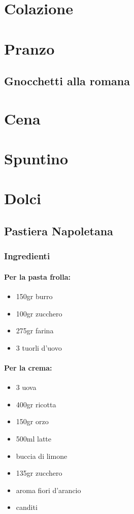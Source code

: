 \chapter{Colazione}

\chapter{Pranzo}
\section{Gnocchetti alla romana}
\chapter{Cena}

\chapter{Spuntino}
\chapter{Dolci}
\section{Pastiera Napoletana}
\subsection{Ingredienti}
\subsubsection{Per la pasta frolla:}
\begin{itemize}
\item 150gr burro
\item 100gr zucchero
\item 275gr farina
\item 3 tuorli d'uovo
\end{itemize}
\subsubsection{Per la crema:}
\begin{itemize}
\item 3 uova
\item 400gr ricotta
\item 150gr orzo
\item 500ml latte
\item buccia di limone
\item 135gr zucchero
\item aroma fiori d'arancio
\item canditi
\end{itemize}

